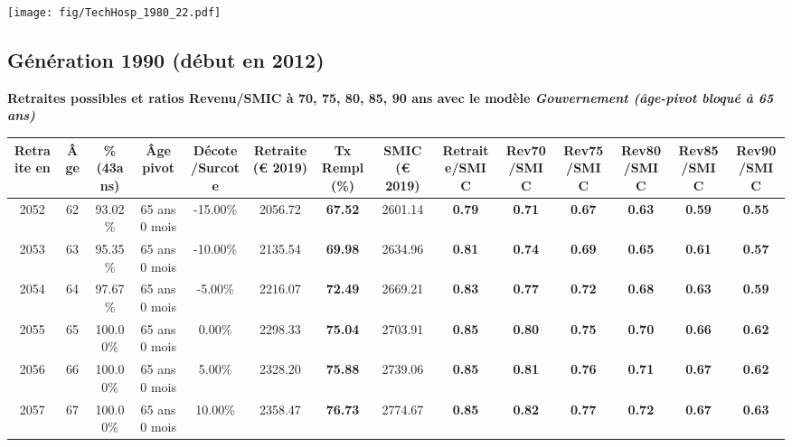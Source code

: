  \vspace{0.1cm} 

 \begin{center}\texttt{[image: fig/TechHosp\_1980\_22.pdf]}\end{center} \label{fig/TechHosp_1980_22.pdf} 

\newpage 
 
\subsection{Génération 1990 (début en 2012)} 

{\bf \noindent Retraites possibles et ratios Revenu/SMIC à 70, 75, 80, 85, 90 ans avec le modèle \emph{Gouvernement (âge-pivot bloqué à 65 ans)}}  
 
\begin{adjustbox}{max width=\textwidth} 
\begin{tabular}[htb]{|c|c||c|c|c||c|c||c||c|c|c|c|c|c|} 
\hline 
 Retraite en &  Âge &  \%(43ans) &  Âge pivot &  Décote/Surcote &  Retraite (\euro{} 2019) &  Tx Rempl(\%) &  SMIC (\euro{} 2019) &  Retraite/SMIC &  Rev70/SMIC &  Rev75/SMIC &  Rev80/SMIC &  Rev85/SMIC &  Rev90/SMIC \\ 
\hline \hline 
 2052 &  62 &  93.02\% &  65 ans 0 mois &  -15.00\% &  2056.72 &  {\bf 67.52} &  2601.14 &  {\bf {\color{red} 0.79}} &  {\bf {\color{red} 0.71}} &  {\bf {\color{red} 0.67}} &  {\bf {\color{red} 0.63}} &  {\bf {\color{red} 0.59}} &  {\bf {\color{red} 0.55}} \\ 
\hline 
 2053 &  63 &  95.35\% &  65 ans 0 mois &  -10.00\% &  2135.54 &  {\bf 69.98} &  2634.96 &  {\bf {\color{red} 0.81}} &  {\bf {\color{red} 0.74}} &  {\bf {\color{red} 0.69}} &  {\bf {\color{red} 0.65}} &  {\bf {\color{red} 0.61}} &  {\bf {\color{red} 0.57}} \\ 
\hline 
 2054 &  64 &  97.67\% &  65 ans 0 mois &  -5.00\% &  2216.07 &  {\bf 72.49} &  2669.21 &  {\bf {\color{red} 0.83}} &  {\bf {\color{red} 0.77}} &  {\bf {\color{red} 0.72}} &  {\bf {\color{red} 0.68}} &  {\bf {\color{red} 0.63}} &  {\bf {\color{red} 0.59}} \\ 
\hline 
 2055 &  65 &  100.00\% &  65 ans 0 mois &  0.00\% &  2298.33 &  {\bf 75.04} &  2703.91 &  {\bf {\color{red} 0.85}} &  {\bf {\color{red} 0.80}} &  {\bf {\color{red} 0.75}} &  {\bf {\color{red} 0.70}} &  {\bf {\color{red} 0.66}} &  {\bf {\color{red} 0.62}} \\ 
\hline 
 2056 &  66 &  100.00\% &  65 ans 0 mois &  5.00\% &  2328.20 &  {\bf 75.88} &  2739.06 &  {\bf {\color{red} 0.85}} &  {\bf {\color{red} 0.81}} &  {\bf {\color{red} 0.76}} &  {\bf {\color{red} 0.71}} &  {\bf {\color{red} 0.67}} &  {\bf {\color{red} 0.62}} \\ 
\hline 
 2057 &  67 &  100.00\% &  65 ans 0 mois &  10.00\% &  2358.47 &  {\bf 76.73} &  2774.67 &  {\bf {\color{red} 0.85}} &  {\bf {\color{red} 0.82}} &  {\bf {\color{red} 0.77}} &  {\bf {\color{red} 0.72}} &  {\bf {\color{red} 0.67}} &  {\bf {\color{red} 0.63}} \\ 
\hline 
\hline 
\end{tabular} 
\end{adjustbox} 
 
